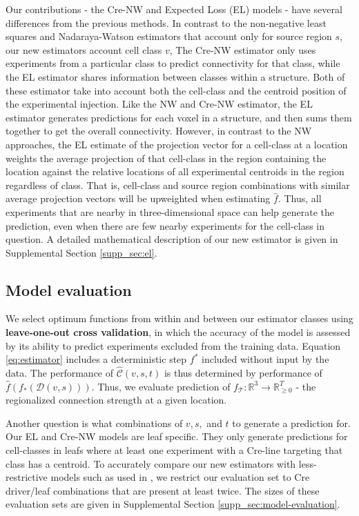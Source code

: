 Our contributions - the Cre-NW and Expected Loss (EL) models - have several differences from the previous methods.
In contrast to the non-negative least squares \citep{Oh2014-kh} and Nadaraya-Watson  \citep{Knox2019-ot} estimators that account only for source region $s$, our new estimators account cell class $v$, 
The Cre-NW estimator only uses experiments from a particular class to predict connectivity for that class, while the EL estimator shares information between classes within a structure.
Both of these estimator take into account both the cell-class and the centroid position of the experimental injection.
Like the NW and Cre-NW estimator, the EL estimator generates predictions for each voxel in a structure, and then sums them together to get the overall connectivity.
However, in contrast to the NW approaches, the EL estimate of the projection vector for a cell-class at a location weights the average projection of that cell-class in the region containing the location against the relative locations of all experimental centroids in the region regardless of class.
That is, cell-class and source region combinations with similar average projection vectors will be upweighted when estimating $\widehat f$.
Thus, all experiments that are nearby in three-dimensional space can help generate the prediction, even when there are few nearby experiments for the cell-class in question.
A detailed mathematical description of our new estimator is given in Supplemental Section \ref{supp_sec:el}.

\newpage

\subsection{Model evaluation}

We select optimum functions from within and between our estimator classes using \textbf{leave-one-out cross validation}, in which the accuracy of the model is assessed by its ability to predict experiments excluded from the training data.
Equation \ref{eq:estimator} includes a deterministic step $f^*$ included without input by the data.
The performance of $\widehat {\mathcal C} (v,s,t)$ is thus determined by performance of $\widehat f (f_*(\mathcal D(v,s)))$.
Thus, we evaluate prediction of $f_{\mathcal T}: \mathbb R^3 \to \mathbb R_{\geq 0}^T$ - the regionalized connection strength at a given location.

Another question is what combinations of $v, s, $ and $t$ to generate a prediction for.
Our EL and Cre-NW models are leaf specific.
They only generate predictions for cell-classes in leafs where at least one experiment with a Cre-line targeting that class has a centroid.
To accurately compare our new estimators with less-restrictive models such as used in \citet{Knox2019-ot}, we restrict our evaluation set to Cre driver/leaf combinations that are present at least twice. 
The sizes of these evaluation sets are given in Supplemental Section \ref{supp_sec:model-evaluation}.

